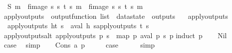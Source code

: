 \begin{isabellebody}
\ \ {\isachardoublequoteopen}S\ m\ {\isacharequal}\ {\isacharparenleft}fimage\ {\isacharparenleft}{\isasymlambda}{\isacharparenleft}{\isacharparenleft}s{\isacharcomma}\ s{\isacharprime}{\isacharparenright}{\isacharcomma}\ t{\isacharparenright}{\isachardot}\ s{\isacharparenright}\ m{\isacharparenright}\ {\isacharbar}{\isasymunion}{\isacharbar}\ fimage\ {\isacharparenleft}{\isasymlambda}{\isacharparenleft}{\isacharparenleft}s{\isacharcomma}\ s{\isacharprime}{\isacharparenright}{\isacharcomma}\ t{\isacharparenright}{\isachardot}\ s{\isacharprime}{\isacharparenright}\ m{\isachardoublequoteclose}\isanewline
\isanewline
{}\isamarkupfalse%
\ apply{\isacharunderscore}outputs\ {\isacharcolon}{\isacharcolon}\ {\isachardoublequoteopen}output{\isacharunderscore}function\ list\ {\isasymRightarrow}\ datastate\ {\isasymRightarrow}\ outputs{\isachardoublequoteclose}\ \isanewline
\ \ {\isachardoublequoteopen}apply{\isacharunderscore}outputs\ {\isacharbrackleft}{\isacharbrackright}\ {\isacharunderscore}\ {\isacharequal}\ {\isacharbrackleft}{\isacharbrackright}{\isachardoublequoteclose}\ {\isacharbar}\isanewline
\ \ {\isachardoublequoteopen}apply{\isacharunderscore}outputs\ {\isacharparenleft}h{\isacharhash}t{\isacharparenright}\ s\ {\isacharequal}\ {\isacharparenleft}aval\ h\ s{\isacharparenright}{\isacharhash}{\isacharparenleft}apply{\isacharunderscore}outputs\ t\ s{\isacharparenright}{\isachardoublequoteclose}\isanewline
\isanewline
{}\isamarkupfalse%
\ apply{\isacharunderscore}outputs{\isacharunderscore}alt{\isacharcolon}\ {\isachardoublequoteopen}apply{\isacharunderscore}outputs\ p\ s\ {\isacharequal}\ map\ {\isacharparenleft}{\isasymlambda}p{\isachardot}\ aval\ p\ s{\isacharparenright}\ p{\isachardoublequoteclose}\isanewline
%
\isadelimproof
%
\endisadelimproof
%
\isatagproof
{}\isamarkupfalse%
{\isacharparenleft}induct\ p{\isacharparenright}\isanewline
\ \ \isamarkupfalse%
\ Nil\isanewline
\ \ \isamarkupfalse%
\ \isamarkupfalse%
\ {\isacharquery}case\ \isamarkupfalse%
\ simp\isanewline
{}\isamarkupfalse%
\isanewline
\ \ \isamarkupfalse%
\ {\isacharparenleft}Cons\ a\ p{\isacharparenright}\isanewline
\ \ \isamarkupfalse%
\ \isamarkupfalse%
\ {\isacharquery}case\isanewline
\ \ \ \ \isamarkupfalse%
\ simp\isanewline
{}\isamarkupfalse%
%
\endisatagproof
{\isafoldproof}%
%
\isadelimproof
\isanewline
%
\endisadelimproof
\isanewline
{}\isamarkupfalse%

\end{isabellebody}
